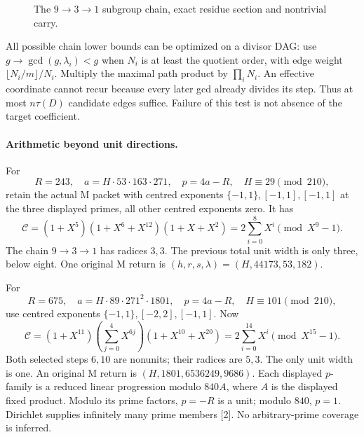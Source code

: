 \documentclass[10pt,reqno]{amsart}
\begin{document}
\begin{figure}[ht]
\centering

\caption{The $9\to3\to1$ subgroup chain, exact residue section and nontrivial
carry.}
\end{figure}

All possible chain lower bounds can be optimized on a divisor DAG: use
$g\to\gcd(g,\lambda_i)<g$ when $N_i$ is at least the quotient order, with
edge weight $\lfloor N_i/m\rfloor/N_i$. Multiply the maximal path product by
$\prod_iN_i$. An effective coordinate cannot recur because every later gcd
already divides its step. Thus at most $n\tau(D)$ candidate edges suffice.
Failure of this test is not absence of the target coefficient.

\paragraph{Arithmetic beyond unit directions.}
For
\[
 R=243,\quad a=H\cdot53\cdot163\cdot271,\quad p=4a-R,\quad H\equiv29\pmod{210},
\]
retain the actual M packet with centred exponents $\{-1,1\},[-1,1],[-1,1]$
at the three displayed primes, all other centred exponents zero. It has
\[
 \mathcal C=(1+X^5)(1+X^6+X^{12})(1+X+X^2)
           =2\sum_{i=0}^8X^i\pmod{X^9-1}.
\]
The chain $9\to3\to1$ has radices $3,3$. The previous total unit width is only
three, below eight. One original M return is
$(h,r,s,\lambda)=(H,44173,53,182)$.

For
\[
 R=675,\quad a=H\cdot89\cdot271^2\cdot1801,\quad p=4a-R,
 \quad H\equiv101\pmod{210},
\]
use centred exponents $\{-1,1\},[-2,2],[-1,1]$. Now
\[
 \mathcal C=(1+X^{11})\left(\sum_{j=0}^4X^{6j}\right)
                    (1+X^{10}+X^{20})
 =2\sum_{i=0}^{14}X^i\pmod{X^{15}-1}.
\]
Both selected steps $6,10$ are nonunits; their radices are $5,3$.
The only unit width is one. An original M return is
$(H,1801,6536249,9686)$.
Each displayed $p$-family is a reduced linear progression modulo $840A$, where
$A$ is the displayed fixed product. Modulo its prime factors, $p=-R$ is a unit;
modulo $840$, $p=1$. Dirichlet supplies infinitely many prime members [2].
No arbitrary-prime coverage is inferred.
\end{document}

